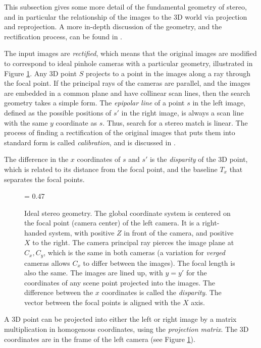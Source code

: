 \documentclass[twocolumn,oneside]{book}
\begin{document}
This subsection gives some more detail of the fundamental geometry of
stereo, and in particular the relationship of the images to the 3D
world via projection and reprojection.  A more in-depth discussion of
the geometry, and the rectification process, can be found in \cite{hartley}.


The input images are {\em rectified}, which means that the original
images are modified to correspond to ideal pinhole cameras with a
particular geometry, illustrated in Figure \ref{fig23.stereo-geometry}.
Any 3D point $S$ projects to a point in the images along a ray through
the focal point.  If the principal rays of the cameras are parallel,
and the images are embedded in a common plane and have collinear scan
lines, then the search geometry takes a simple form.  The {\em
epipolar line} of a point $s$ in the left image, defined as the
possible positions of $s'$ in the right image, is always a scan line
with the same $y$ coordinate as $s$.  Thus, search for a stereo match
is linear.  The process of finding a rectification of the original
images that puts them into standard form is called {\em calibration},
and is discussed in \cite{hartley}.

The difference in the $x$ coordinates of $s$ and $s'$ is the {\em
disparity} of the 3D point, which is related to its distance from the
focal point, and the baseline $T_x$ that separates the focal points.

\begin{figure}

{\epsfxsize = 0.47\textwidth {}}

\caption{
Ideal stereo geometry.  The global coordinate system is centered on
the focal point (camera center) of the left camera.  It is a
right-handed system, with positive $Z$ in front of the camera, and
positive $X$ to the right.  The camera principal ray pierces the image
plane at $C_x,C_y$, which is the same in both cameras (a variation for
{\em verged} cameras allows $C_x$ to differ between the images).  The
focal length is also the same.  The images are lined up, with $y=y'$
for the coordinates of any scene point projected into the images.  The
difference between the $x$ coordinates is called the {\em disparity}.
The vector between the focal points is aligned with the $X$ axis.
\label{fig23.stereo-geometry}}

\end{figure}


A 3D point can be projected into either the left or right image by a
matrix multiplication in homogenous coordinates, using the {\em
projection matrix}.  The 3D coordinates are in the frame of the left
camera (see Figure \ref{fig23.stereo-geometry}).
\end{document}
